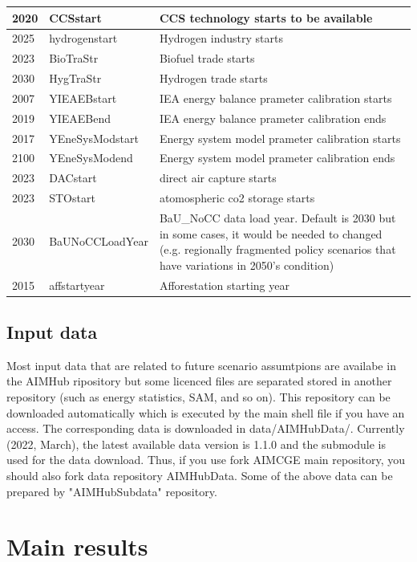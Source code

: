\documentclass[10pt,a4paper,titlepage,dvipdfmx]{book}
\begin{document}
\begin{tabularx}{\textwidth}{|
p{}|
p{}|
p{}|}
2020 & CCSstart & CCS technology starts to be available \\\hline 
2025 & hydrogenstart & Hydrogen industry starts \\\hline 
2023 & BioTraStr & Biofuel trade starts \\\hline 
2030 & HygTraStr & Hydrogen trade starts \\\hline 
2007 & YIEAEBstart & IEA energy balance prameter calibration starts \\\hline 
2019 & YIEAEBend & IEA energy balance prameter calibration ends \\\hline 
2017 & YEneSysModstart & Energy system model prameter calibration starts \\\hline 
2100 & YEneSysModend & Energy system model prameter calibration ends \\\hline 
2023 & DACstart & direct air capture starts \\\hline 
2023 & STOstart & atomospheric co2 storage starts \\\hline 
2030 & BaUNoCCLoadYear & BaU_NoCC data load year. Default is 2030 but in some cases, it would be needed to changed (e.g. regionally fragmented policy scenarios that have variations in 2050's condition) \\\hline 
2015 & affstartyear & Afforestation starting year \\\hline 
\end{tabularx}

\section{\label{sec:InpData}Input data}
Most input data that are related to future scenario assumtpions are availabe in the AIMHub ripository but some licenced files are separated stored in another repository (such as energy statistics, SAM, and so on).
This repository can be downloaded automatically which is executed by the main shell file if you have an access.
The corresponding data is downloaded in data/AIMHubData/. Currently (2022, March), the latest available data version is 1.1.0 and the submodule is used for the data download. Thus, if you use fork AIMCGE main repository, you should also fork data repository AIMHubData.
Some of the above data can be prepared by "AIMHubSubdata" repository.


\chapter{\label{chp:MainRes}Main results}
\end{document}
